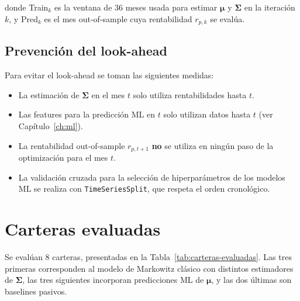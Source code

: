 donde Train$_k$ es la ventana de 36 meses usada para estimar
$\boldsymbol{\mu}$ y $\boldsymbol{\Sigma}$ en la iteración $k$, y Pred$_k$
es el mes out-of-sample cuya rentabilidad $r_{p,k}$ se evalúa.

\subsection{Prevención del look-ahead}

Para evitar el look-ahead se toman las siguientes medidas:
\begin{itemize}
    \item La estimación de $\boldsymbol{\Sigma}$ en el mes $t$ solo utiliza
          rentabilidades hasta $t$.
    \item Las features para la predicción ML en $t$ solo utilizan datos
          hasta $t$ (ver Capítulo~\ref{ch:ml}).
    \item La rentabilidad out-of-sample $r_{p,t+1}$ \textbf{no} se utiliza
          en ningún paso de la optimización para el mes $t$.
    \item La validación cruzada para la selección de hiperparámetros de los
          modelos ML se realiza con \texttt{TimeSeriesSplit}, que respeta el
          orden cronológico.
\end{itemize}

\section{Carteras evaluadas}

Se evalúan 8 carteras, presentadas en la Tabla~\ref{tab:carteras-evaluadas}.
Las tres primeras corresponden al modelo de Markowitz clásico con distintos
estimadores de $\boldsymbol{\Sigma}$, las tres siguientes incorporan
predicciones ML de $\boldsymbol{\mu}$, y las dos últimas son baselines
pasivos.


